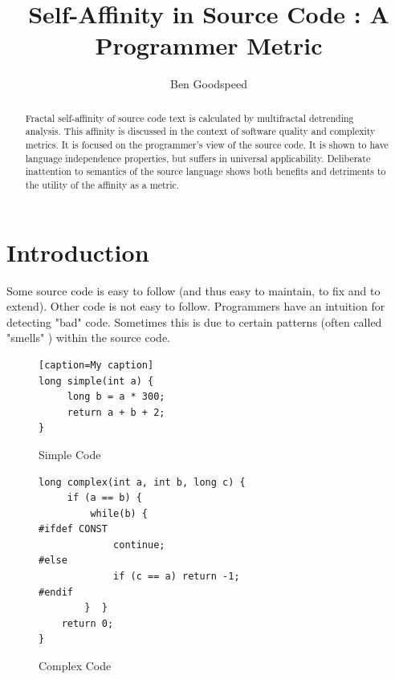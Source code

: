 \documentclass[12pt]{article}
\begin{document}
\title{Self-Affinity in Source Code : A Programmer Metric}
\author{Ben  Goodspeed}

\maketitle
\pagebreak


\begin{abstract}
Fractal self-affinity of source code text is calculated by multifractal detrending analysis.  This affinity is discussed in the context of software quality and complexity metrics.  It is focused on the programmer's view of the source code.  It is shown to have language independence properties, but suffers in universal applicability.  Deliberate inattention to semantics of the source language shows both benefits and detriments to the utility of the affinity as a metric.
\end{abstract}

\tableofcontents
\listoffigures

\pagebreak
\section{Introduction}
Some source code is easy to follow (and thus easy to maintain, to fix and to extend).  Other code is not easy to follow.  Programmers have an intuition for detecting "bad" \cite{Feathers:WEWLC:04, 
Martin:CleanCode:08}
 code.  Sometimes this is due to certain patterns (often called "smells" \cite{Fowler:Refactoring:99}) within the source code.

\lstset{language=C}

\begin{figure}[h]
\centering
\begin{minipage}[b]{0.40\linewidth}
\begin{lstlisting}[frame=single][caption=My caption]
long simple(int a) {
     long b = a * 300;
     return a + b + 2;
}
\end{lstlisting} 

\caption{Simple Code}
\label{fig:minipage1}
\end{minipage}
\quad
\begin{minipage}[b]{0.55\linewidth}
\begin{lstlisting}[frame=single]
long complex(int a, int b, long c) {
     if (a == b) {
         while(b) {
#ifdef CONST         
             continue;
#else
             if (c == a) return -1;
#endif
        }  }
    return 0;
}
\end{lstlisting} 
\caption{Complex Code}
\label{fig:minipage2}
\end{minipage}
\end{figure}
\end{document}
